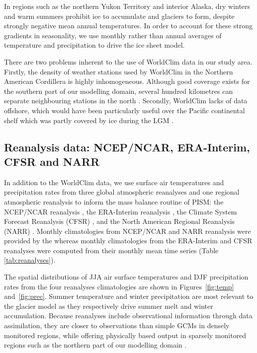In regions such as the northern Yukon Territory and interior Alaska, dry winters and warm summers prohibit ice to accumulate and glaciers to form, despite strongly negative mean annual temperatures. In order to account for these strong gradients in seasonality, we use monthly rather than annual averages of temperature and precipitation to drive the ice sheet model.

There are two problems inherent to the use of WorldClim data in our study area. Firstly, the density of weather stations used by WorldClim in the Northern American Cordillera is highly inhomogeneous. Although good coverage exists for the southern part of our modelling domain, several hundred kilometres can separate neighbouring stations in the north \citep{data:worldclim}. Secondly, WorldClim lacks of data offshore, which would have been particularly useful over the Pacific continental shelf which was partly covered by ice during the LGM \citep{jackson-clague-1991}.


\subsection{Reanalysis data: NCEP/NCAR, ERA-Interim, CFSR and NARR}

In addition to the WorldClim data, we use surface air temperatures and precipitation rates from three global atmospheric reanalyses and one regional atmospheric reanalysis to inform the mass balance routine of PISM: the NCEP/NCAR reanalysis \citep{data:ncar}, the ERA-Interim reanalysis \citep{data:erai}, the Climate System Forecast Reanalysis (CFSR) \citep{data:cfsr}, and the North American Regional Reanalysis (NARR) \citep{data:narr}. Monthly climatologies from NCEP/NCAR and NARR reanalysis were provided by the \citet{web:psd} whereas monthly climatologies from the ERA-Interim and CFSR reanalyses were computed from their monthly mean time series (Table \ref{tab:reanalyses}).

The spatial distributions of JJA air surface temperatures and DJF precipitation rates from the four reanalyses climatologies are shown in Figures~\ref{fig:temp} and~\ref{fig:prec}. Summer temperature and winter precipitation are most relevant to the glacier model as they respectively drive summer melt and winter accumulation. Because reanalyses include observational information through data assimilation, they are closer to observations than simple GCMs in densely monitored regions, while offering physically based output in sparsely monitored regions such as the northern part of our modelling domain \citep{bengtsson-etal-2007}.

